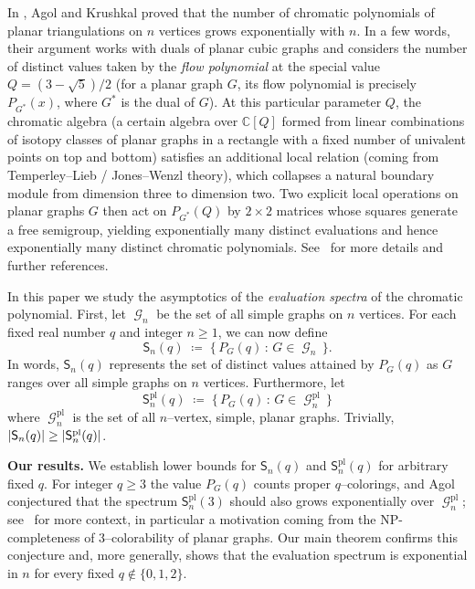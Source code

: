 \documentclass[A4paper,reqno,oneside,12pt]{amsart}
\theoremstyle{plain}
\theoremstyle{definition}
\newcommand{\abs}[1]{\left| #1 \right|}
\DeclareMathOperator{\pl}{\mathrm{pl}}
\DeclareMathOperator{\mG}{\mathcal{G}}
\begin{document}
 In \cite{AKTutte}, Agol and Krushkal proved that the number of chromatic polynomials of planar triangulations on $n$ vertices grows exponentially with $n$. In a few words, their argument works with duals of planar cubic graphs and considers the number of distinct values taken by the \emph{flow polynomial} at the special value
$Q=(3-\sqrt5)/2$ (for a planar graph $G$, its flow polynomial is precisely $P_{G^{*}}(x)$, where $G^{*}$ is the dual of $G$). At this particular parameter $Q$, the chromatic algebra (a certain algebra over $\mathbb{C}[Q]$ formed from linear combinations of isotopy classes of planar graphs in a rectangle with a fixed number of univalent points on top and bottom) satisfies an additional local relation (coming from Temperley--Lieb / Jones--Wenzl theory),
which collapses a natural boundary module from dimension three to dimension two.
Two explicit local operations on planar graphs $G$ then act on $P_{G^{*}}(Q)$ by $2\times2$ matrices whose squares generate a free semigroup,
yielding exponentially many distinct evaluations and hence exponentially many distinct chromatic polynomials.
See~\cite{AKFlow,AKTutte} for more details and further references. 

In this paper we study the asymptotics of the \emph{evaluation spectra} of the chromatic polynomial. First, let $\mG_n$ be the set of all simple graphs on $n$ vertices. For each fixed real number $q$ and integer $n\ge 1$, we can now define
\[
\mathsf{S}_n(q)\;\coloneqq \;\{\,P_G(q)\,:\,G \in \mG_n\,\}.
\]
In words, $\mathsf{S}_n(q)$ represents the set of distinct values attained by $P_G(q)$ as $G$ ranges over all simple graphs on $n$ vertices. Furthermore, let 
\begin{equation*}
    \mathsf{S}_n^{\pl}(q) \; \coloneqq \; \{\, P_G(q) \, : \, G \in \mG_n^{\pl} \, \}
\end{equation*}
where $\mG_n^{\pl}$ is the set of all $n$--vertex, simple, planar graphs. Trivially, $\abs{\mathsf{S}_n(q)} \geq \abs{\smash{\mathsf{S}_n^{\pl}}(q)}$. 

\medskip
\noindent\textbf{Our results.}
We establish lower bounds for $\mathsf{S}_n(q)$ and $\mathsf{S}_n^{\pl}(q)$ for arbitrary fixed $q$. For integer $q\ge 3$ the value $P_G(q)$ counts proper $q$--colorings, and Agol conjectured that the spectrum $\mathsf{S}_n^{\pl}(3)$ should also grows exponentially over $\mG_n^{\pl}$; see~\cite{TreumannMO} for more context, in particular a motivation coming from the {\sf NP}-completeness of $3$--colorability of planar graphs. 
Our main theorem confirms this conjecture and, more generally, shows that the evaluation spectrum is exponential in $n$ for every fixed
$q\notin\{0,1,2\}$.
\end{document}
